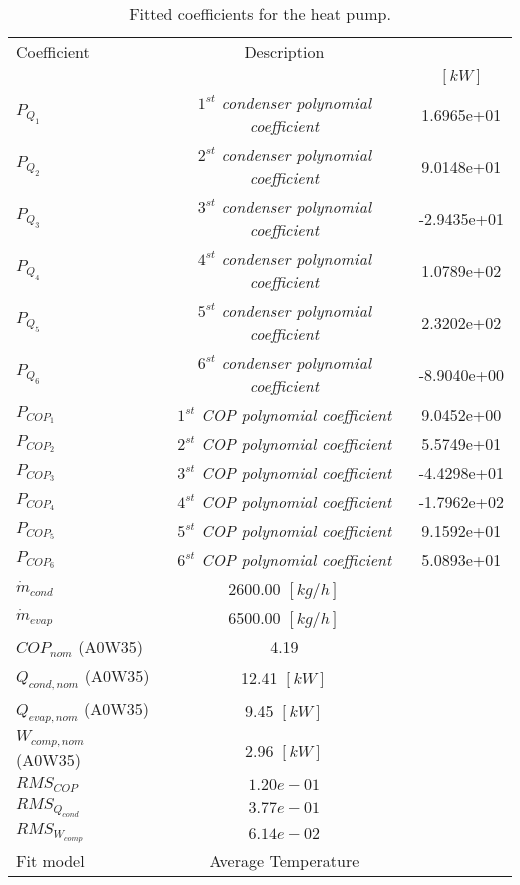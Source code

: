 \documentclass[english]{SPFShortReport}
\author{Dani Carbonell}
\begin{document}
\begin{table}[!ht]
\begin{small}
\caption{Fitted coefficients for the heat pump.}
\begin{center}
\resizebox{12cm}{!} 
{
\begin{tabular}{l | c c } 
\hline
\hline
Coefficient &Description & \\ 
 & &$[kW]$\\ 
\hline
$P_{Q_{1}}$ & \emph{$1^{st}$ condenser polynomial coefficient}  & 1.6965e+01    \\ 
$P_{Q_{2}}$ & \emph{$2^{st}$ condenser polynomial coefficient}  & 9.0148e+01    \\ 
$P_{Q_{3}}$ & \emph{$3^{st}$ condenser polynomial coefficient}  & -2.9435e+01    \\ 
$P_{Q_{4}}$ & \emph{$4^{st}$ condenser polynomial coefficient}  & 1.0789e+02    \\ 
$P_{Q_{5}}$ & \emph{$5^{st}$ condenser polynomial coefficient}  & 2.3202e+02    \\ 
$P_{Q_{6}}$ & \emph{$6^{st}$ condenser polynomial coefficient}  & -8.9040e+00    \\ 
\hline
$P_{COP_{1}}$ & \emph{$1^{st}$ COP polynomial coefficient}  & 9.0452e+00    \\ 
$P_{COP_{2}}$ & \emph{$2^{st}$ COP polynomial coefficient}  & 5.5749e+01    \\ 
$P_{COP_{3}}$ & \emph{$3^{st}$ COP polynomial coefficient}  & -4.4298e+01    \\ 
$P_{COP_{4}}$ & \emph{$4^{st}$ COP polynomial coefficient}  & -1.7962e+02    \\ 
$P_{COP_{5}}$ & \emph{$5^{st}$ COP polynomial coefficient}  & 9.1592e+01    \\ 
$P_{COP_{6}}$ & \emph{$6^{st}$ COP polynomial coefficient}  & 5.0893e+01    \\ 
\hline
$\dot m_{cond}$ & 2600.00 $[kg/h]$ \\ 
$\dot m_{evap}$ & 6500.00 $[kg/h]$ \\ 
\hline
$COP_{nom}$ (A0W35)& 4.19 \\ 
$Q_{cond,nom}$ (A0W35)& 12.41 $[kW]$\\ 
$Q_{evap,nom}$ (A0W35)& 9.45 $[kW]$\\ 
$W_{comp,nom}$ (A0W35)& 2.96 $[kW]$\\ 
\hline
 $RMS_{COP}$ & $1.20e-01$ \\ 
 $RMS_{Q_{cond}}$ & $3.77e-01$ \\ 
 $RMS_{W_{comp}}$ & $6.14e-02$ \\ 
\hline
Fit model & Average Temperature\\ 
\hline
\hline
\end{tabular}
}
\label{CoefTable}
\end{center}
\end{small}
\end{table}
\end{document}
